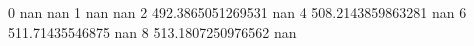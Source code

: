0 nan nan
1 nan nan
2 492.3865051269531 nan
4 508.2143859863281 nan
6 511.71435546875 nan
8 513.1807250976562 nan
